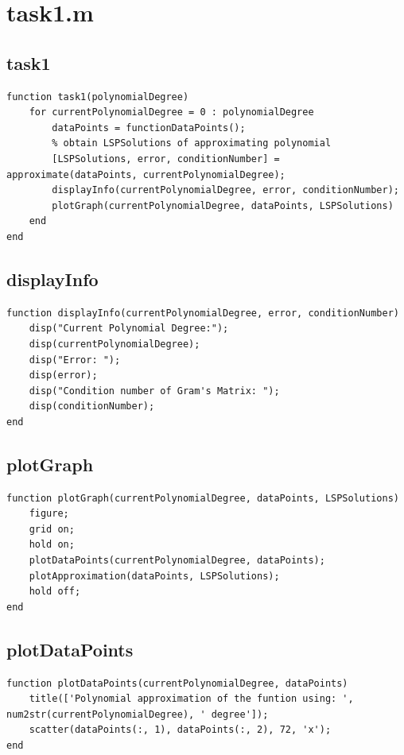 \section{task1.m}
\subsection{task1}
\begin{simplechar}
\begin{lstlisting}
function task1(polynomialDegree)
    for currentPolynomialDegree = 0 : polynomialDegree
        dataPoints = functionDataPoints();
        % obtain LSPSolutions of approximating polynomial
        [LSPSolutions, error, conditionNumber] = approximate(dataPoints, currentPolynomialDegree);
        displayInfo(currentPolynomialDegree, error, conditionNumber);
        plotGraph(currentPolynomialDegree, dataPoints, LSPSolutions)
    end
end
\end{lstlisting}
\end{simplechar}

\subsection{displayInfo}
\begin{simplechar}
\begin{lstlisting}
function displayInfo(currentPolynomialDegree, error, conditionNumber)
    disp("Current Polynomial Degree:");
    disp(currentPolynomialDegree);
    disp("Error: ");
    disp(error);
    disp("Condition number of Gram's Matrix: ");
    disp(conditionNumber);
end
\end{lstlisting}
\end{simplechar}

\subsection{plotGraph}
\begin{simplechar}
\begin{lstlisting}
function plotGraph(currentPolynomialDegree, dataPoints, LSPSolutions)
    figure;
    grid on;
    hold on;
    plotDataPoints(currentPolynomialDegree, dataPoints);
    plotApproximation(dataPoints, LSPSolutions);
    hold off;
end
\end{lstlisting}
\end{simplechar}

\subsection{plotDataPoints}
\begin{simplechar}
\begin{lstlisting}
function plotDataPoints(currentPolynomialDegree, dataPoints)
    title(['Polynomial approximation of the funtion using: ', num2str(currentPolynomialDegree), ' degree']);
    scatter(dataPoints(:, 1), dataPoints(:, 2), 72, 'x');
end
\end{lstlisting}
\end{simplechar}

